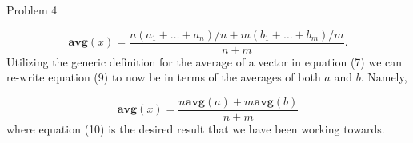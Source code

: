 \begin{problem}{Problem 4}
\begin{highlight}
        \begin{equation}
            \mathbf{avg}(x) = \frac{n(a_{1} + \dots + a_{n})/n + m(b_{1} + \dots + b_{m})/m}{n + m}.
        \end{equation}
        Utilizing the generic definition for the average of a vector in equation (7) we can re-write equation (9) to now be in terms of the averages of both $a$ and $b$. Namely,

        \begin{equation}
            \mathbf{avg}(x) = \frac{n\mathbf{avg}(a) + m\mathbf{avg}(b)}{n + m}
        \end{equation}
        where equation (10) is the desired result that we have been working towards.
    \end{highlight}
\end{problem}

